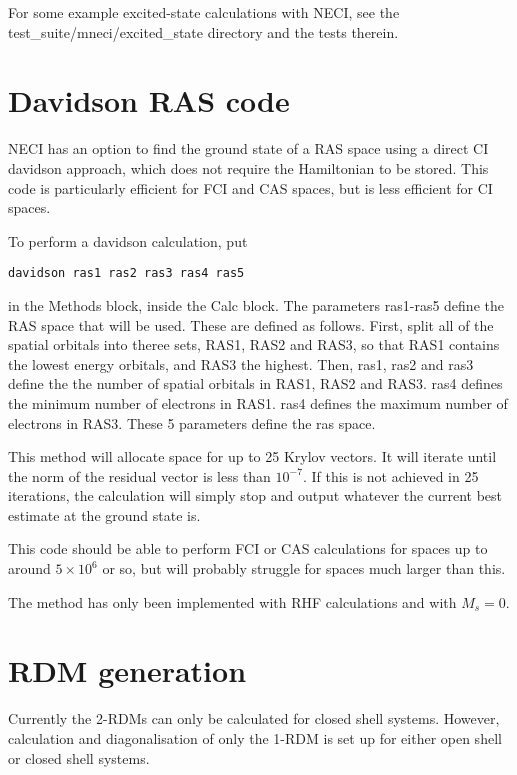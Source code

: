 \documentclass[a4paper,notitlepage]{scrreprt}
\begin{document}
    For some example excited-state calculations with NECI, see the
    test\_suite/mneci/excited\_state directory and the tests therein.

\section{Davidson RAS code}

    NECI has an option to find the ground state of a RAS space using a
    direct CI davidson approach, which does not require the Hamiltonian to be
    stored. This code is particularly efficient for FCI and CAS spaces, but is
    less efficient for CI spaces.

    To perform a davidson calculation, put
    \begin{lstlisting}[gobble=4]
    	davidson ras1 ras2 ras3 ras4 ras5
    \end{lstlisting}
    in the Methods block, inside the Calc block. The parameters ras1-ras5 define
    the RAS space that will be used. These are defined as follows. First,
    split all of the spatial orbitals into theree sets, RAS1, RAS2 and RAS3,
    so that RAS1 contains the lowest energy orbitals, and RAS3 the highest.
    Then, ras1, ras2 and ras3 define the the number of spatial orbitals in
    RAS1, RAS2 and RAS3. ras4 defines the minimum number of electrons in RAS1.
    ras4 defines the maximum number of electrons in RAS3. These 5 parameters
    define the ras space.

    This method will allocate space for up to 25 Krylov vectors. It will iterate
    until the norm of the residual vector is less than $10^{-7}$. If this is
    not achieved in 25 iterations, the calculation will simply stop and output
    whatever the current best estimate at the ground state is.

    This code should be able to perform FCI or CAS calculations for spaces up
    to around $5\times10^6$ or so, but will probably struggle for spaces much
    larger than this.

    The method has only been implemented with RHF calculations and with $M_s=0$.

\section{RDM generation}
\label{sec:rdms}
Currently the 2-RDMs can only be calculated for closed shell systems.  However, calculation and
diagonalisation of only the 1-RDM is set up for either open shell or closed shell systems.
\end{document}
